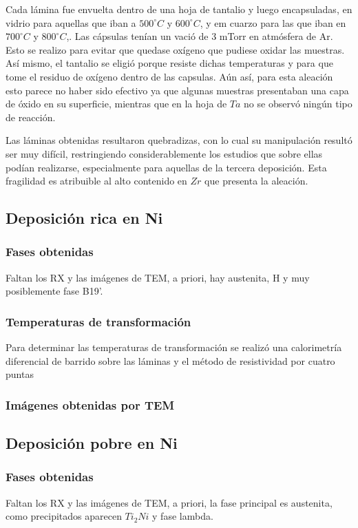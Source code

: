 \documentclass{article}
\theoremstyle{definition}
\theoremstyle{remark}
\begin{document}
Cada lámina fue envuelta dentro de una hoja de tantalio y luego encapsuladas, en vidrio para aquellas que iban a $500 ^\circ C$ y $600 ^\circ C$, y em cuarzo para las que iban en $700 ^\circ C$ y $800 ^\circ C$,. Las cápsulas tenían un vació de 3 mTorr en atmósfera de Ar. Esto se realizo para evitar que quedase oxígeno que pudiese oxidar las muestras. Así mismo, el tantalio se eligió porque resiste dichas temperaturas y para que tome el residuo de oxígeno dentro de las capsulas. Aún así, para esta aleación esto parece no haber sido efectivo ya que algunas muestras presentaban una capa de óxido en su superficie, mientras que en la hoja de $Ta$ no se observó ningún tipo de reacción.

Las láminas obtenidas resultaron quebradizas, con lo cual su manipulación resultó ser muy difícil, restringiendo considerablemente los estudios que sobre ellas podían realizarse, especialmente para aquellas de la tercera deposición. Esta fragilidad es atribuible al alto contenido en $Zr$ que presenta la aleación. 

\subsection{Deposición rica en Ni}
\subsubsection{Fases obtenidas}
Faltan los RX y las imágenes de TEM, a priori, hay austenita, H y muy posiblemente fase B19'.
\subsubsection{Temperaturas de transformación}
Para determinar las temperaturas de transformación se realizó una calorimetría diferencial de barrido sobre las láminas y el método de resistividad por cuatro puntas
\subsubsection{Imágenes obtenidas por TEM}

\subsection{Deposición pobre en Ni}
\subsubsection{Fases obtenidas}
Faltan los RX y las imágenes de TEM, a priori, la fase principal es austenita, como precipitados aparecen $Ti_2Ni$ y fase lambda.
\end{document}
